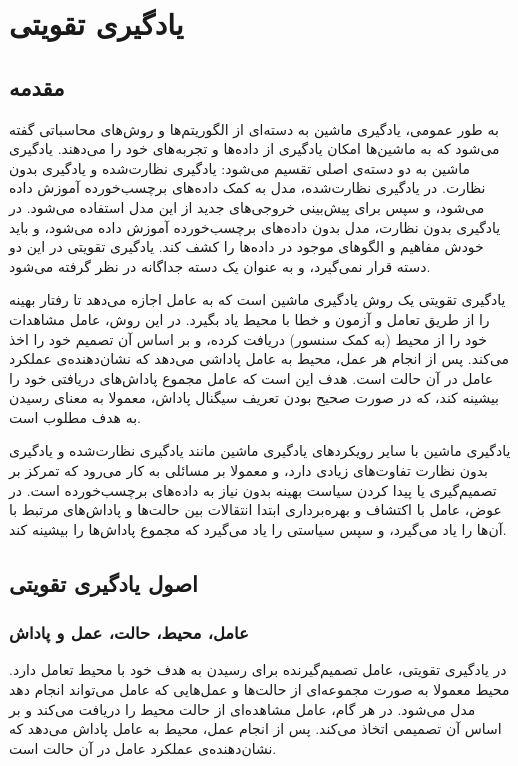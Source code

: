 \chapter{ یادگیری تقویتی}
\section{مقدمه}
به طور عمومی، یادگیری ماشین به دسته‌ای از الگوریتم‌ها و روش‌های محاسباتی گفته می‌شود که به ماشین‌ها امکان یادگیری از داده‌ها و تجربه‌های خود را می‌دهند.
یادگیری ماشین به دو دسته‌ی اصلی تقسیم می‌شود: یادگیری نظارت‌شده و یادگیری بدون نظارت.
در یادگیری نظارت‌شده، مدل به کمک داده‌های برچسب‌خورده آموزش داده می‌شود، و سپس برای پیش‌بینی خروجی‌های جدید از این مدل استفاده می‌شود.
در یادگیری بدون نظارت، مدل بدون داده‌های برچسب‌خورده آموزش داده می‌شود، و باید خودش مفاهیم و الگوهای موجود در داده‌ها را کشف کند.
یادگیری تقویتی در این دو دسته قرار نمی‌گیرد، و به عنوان یک دسته جداگانه در نظر گرفته می‌شود.

یادگیری تقویتی یک روش یادگیری ماشین است که به عامل اجازه می‌دهد تا رفتار بهینه را از طریق تعامل و آزمون و خطا با محیط یاد بگیرد.
در این روش، عامل مشاهدات خود را از محیط (به کمک سنسور)
دریافت کرده،
و بر اساس آن تصمیم خود را اخذ می‌کند.
پس از انجام هر عمل، محیط به عامل پاداشی می‌دهد که نشان‌دهنده‌ی عملکرد عامل در آن حالت است.
هدف این است که عامل مجموع پاداش‌های دریافتی خود را بیشینه کند، که در صورت صحیح بودن تعریف سیگنال پاداش، معمولا به معنای رسیدن به هدف مطلوب است.

یادگیری ماشین با سایر رویکرد‌های یادگیری ماشین مانند یادگیری نظارت‌شده و یادگیری بدون نظارت تفاوت‌های زیادی دارد، 
و معمولا بر مسائلی به کار می‌رود که تمرکز بر تصمیم‌گیری یا پیدا کردن سیاست بهینه بدون نیاز به داده‌های برچسب‌خورده است.
در عوض، عامل با اکتشاف و بهره‌برداری ابتدا انتقالات بین حالت‌ها و پاداش‌های مرتبط با آن‌ها را یاد می‌گیرد، و سپس سیاستی را یاد می‌گیرد که مجموع پاداش‌ها را بیشینه کند.


\section{اصول یادگیری تقویتی}
\subsection{عامل، محیط، حالت، عمل و پاداش}
در یادگیری تقویتی، عامل 
 تصمیم‌گیرنده برای رسیدن به هدف خود با محیط
  تعامل دارد.
محیط معمولا به صورت مجموعه‌ای از حالت‌ها 
  و عمل‌هایی 
    که عامل می‌تواند انجام دهد مدل می‌شود.
در هر گام، عامل مشاهده‌ای از حالت محیط را دریافت می‌کند و بر اساس آن تصمیمی اتخاذ می‌کند.
پس از انجام عمل، محیط به عامل پاداش 
  می‌دهد که نشان‌دهنده‌ی عملکرد عامل در آن حالت است.


